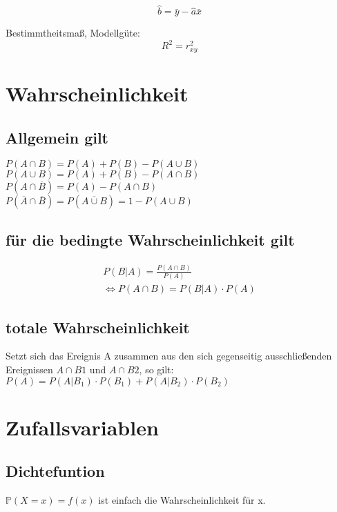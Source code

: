 \documentclass[a4paper, twocolumn]{article}
\begin{document}
        \begin{displaymath}
            \hat b = \bar y - \hat a \bar x
        \end{displaymath}
        
        Bestimmtheitsmaß, Modellgüte:
        \begin{displaymath}
          R^2 = r^2_{xy}
        \end{displaymath}
        
\section{Wahrscheinlichkeit}
	\subsection{Allgemein gilt} 
	$ P(A \cap B) = P(A) + P(B) - P(A \cup B)  $ \\
	$ P(A \cup B) = P(A) + P(B) - P(A \cap B) $ \\
	$ P(A \cap \overline B) = P(A) - P(A \cap B) $ \\
	$ P(\overline A  \cap \overline B) = P(\overline{A \cup B}) = 1 - P(A \cup B) $
	
	\subsection{für die bedingte Wahrscheinlichkeit gilt}
	\begin{gather*}
	P(B|A) = \frac{ P(A \cap B) }{ P(A) } \\
	\Leftrightarrow P(A \cap B) = P(B|A) \cdot P(A)
	\end{gather*}
	
	\subsection{totale Wahrscheinlichkeit}
	Setzt sich das Ereignis A zusammen aus den sich gegenseitig ausschließenden 
	Ereignissen $A \cap B1$ und $A \cap B2$, so gilt: \\
	$  P(A) = P(A | B_1) \cdot P(B_1) + P(A | B_2) \cdot P(B_2) $
	
\section{Zufallsvariablen}
	\subsection{Dichtefuntion} $ \mathbb{P}(X=x) = f(x) $ ist einfach die Wahrscheinlichkeit für x.
\end{document}
